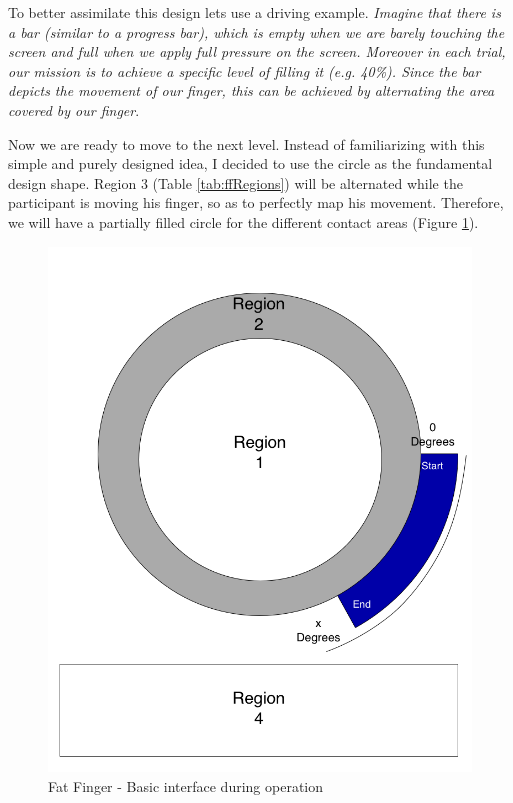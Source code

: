 To better assimilate this design lets use a driving example. \emph{Imagine that there is a bar (similar to a progress bar), which is empty when we are barely touching the screen and full when we apply full pressure on the screen. Moreover in each trial, our mission is to achieve a specific level of filling it (e.g. 40\%). Since the bar depicts the movement of our finger, this can be achieved by alternating the area covered by our finger}. 

Now we are ready to move to the next level. Instead of familiarizing with this simple and purely designed idea, I decided to use the circle as the fundamental design shape. Region 3 (Table \ref{tab:ffRegions}) will be alternated while the participant is moving his finger, so as to perfectly map his movement. Therefore, we will have a partially filled circle for the different contact areas (Figure \ref{fig:FFPartlyFilled}).

 \begin{figure}[H]
\centering
\includegraphics[scale=0.3]{figures/FFPartlyFilled.png}
\caption{Fat Finger - Basic interface during operation}
\label{fig:FFPartlyFilled}
\end{figure}

